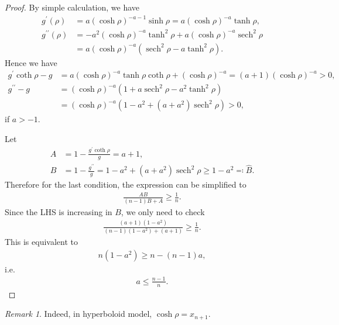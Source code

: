 \documentclass[reqno]{amsart}
\theoremstyle{remark}
\newtheorem{remark}[theorem]{Remark}
\theoremstyle{definition}
\numberwithin{equation}{section}
\begin{document}
\begin{proof}
    By simple calculation, we have
    \begin{align*}
        g^{\prime}(\rho) &= a \left( \cosh \rho \right)^{-a-1} \sinh \rho = a \left( \cosh \rho \right)^{-a} \tanh \rho, \\
        g^{\prime \prime}(\rho) &= -a^2 \left( \cosh \rho \right)^{-a} \tanh^2 \rho + a \left( \cosh \rho \right)^{-a} \operatorname{sech}^2 \rho \\
        &= a \left( \cosh \rho \right)^{-a} \left( \operatorname{sech}^2 \rho - a \tanh^2 \rho \right).
    \end{align*}
    Hence we have
    \begin{align*}
        g^{\prime}\coth \rho - g &= a \left( \cosh \rho \right)^{-a} \tanh \rho \coth \rho + \left( \cosh \rho \right)^{-a} = (a+1) \left( \cosh \rho \right)^{-a} > 0, \\
        g^{\prime \prime} - g &= \left( \cosh \rho \right)^{-a} \left( 1 + a \operatorname{sech}^2 \rho - a^2 \tanh^2 \rho \right) \\
        &= \left( \cosh \rho \right)^{-a} \left( 1 - a^2 + \left( a + a^2 \right) \operatorname{sech}^2 \rho \right) > 0,
    \end{align*}
    if $a>-1$.

    Let
    \begin{align*}
        A &= 1-\frac{g^{\prime} \coth \rho}{g} = a+1, \\
        B &= 1-\frac{g^{\prime \prime}}{g} = 1 - a^2 + \left( a + a^2 \right) \operatorname{sech}^2 \rho \geqslant 1-a^2 \eqqcolon \hat{B}.
    \end{align*}
    Therefore for the last condition, the expression can be simplified to 
    \begin{align*}
        \frac{AB}{\left( n-1 \right)B + A} \geqslant \frac{1}{n}.
    \end{align*}
    Since the LHS is increasing in $B$, we only need to check
    \begin{align*}
        \frac{\left( a+1 \right)\left( 1-a^2 \right)}{\left( n-1 \right)\left( 1-a^2 \right) + \left( a+1 \right)} \geqslant \frac{1}{n}.
    \end{align*}
    This is equivalent to
    \begin{align*}
        n \left( 1-a^2 \right) \geqslant n - \left( n-1 \right) a,
    \end{align*}
    i.e.
    \begin{align*}
                a \leqslant \frac{n-1}{n}.
    \end{align*}
\end{proof}
\begin{remark}
    Indeed, in hyperboloid model, $\cosh \rho = x_{n+1}$.
\end{remark}
\end{document}
